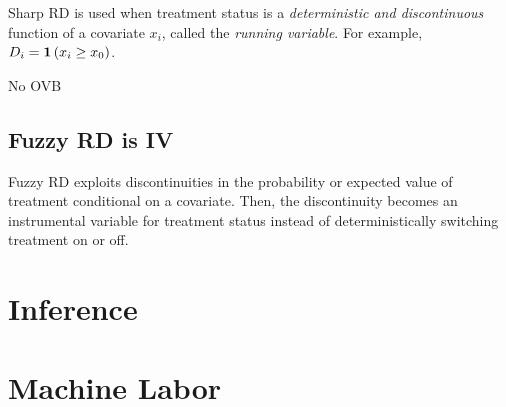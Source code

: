 \documentclass[11pt]{article}
\begin{document}
Sharp RD is used when treatment status is a \emph{deterministic and discontinuous} function of a covariate $x_i$, called the \emph{running variable}. For example, $D_i = \mathbf{1}\left( x_i \geq x_0 \right)$. 

\begin{model}

\end{model}

No OVB

\subsection{Fuzzy RD is IV}

Fuzzy RD exploits discontinuities in the probability or expected value of treatment conditional on a covariate. Then, the discontinuity becomes an instrumental variable for treatment status instead of deterministically switching treatment on or off. 

\section{Inference}

\section{Machine Labor}
\end{document}
